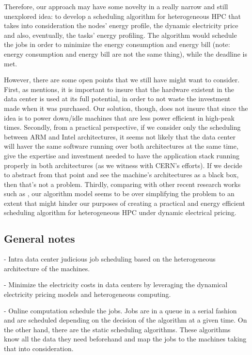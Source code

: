 Therefore, our approach may have some novelty in a really narrow and still
unexplored idea: to develop a scheduling algorithm for heterogeneous HPC that
takes into consideration the nodes' energy profile, the dynamic electricity
price and also, eventually, the tasks' energy profiling. The algorithm would
schedule the jobs in order to minimize the energy consumption and energy bill
(note: energy consumption and energy bill are not the same thing), while the
deadline is met. 

However, there are some open points that we still have might want to
consider. First, as \cite{DYN_PRICING_HPC} mentions, it is important to insure
that the hardware existent in the data center is used at its full potential, in
order to not waste the investment made when it was purchased. Our solution,
though, does not insure that since the idea is to power down/idle machines that 
are less power efficient in high-peak times. Secondly, from a practical
perspective, if we consider only the scheduling between ARM and Intel architectures, 
it seems not likely that the data center will haver the same software running
over both architectures at the same time, give the expertise and investment
needed to have the application stack running properly in both architectures (as
we witness with CERN's efforts). If we decide to abstract from that point and
see the machine's architectures as a black box, then that's not a problem. Thirdly, 
comparing with other recent research works
such as \cite{TASK_SCHED}, our algorithm model seems to be over simplifying the
problem to an extent that might hinder our purposes of creating a practical and
energy efficient scheduling algorithm for heterogeneous HPC under dynamic
electrical pricing.



\subsection*{General notes}

- Intra data center judicious job scheduling based on the heterogeneous
  architecture of the machines.

- Minimize the electricity costs in data centers by leveraging the dynamical 
  electricity pricing models and heterogeneous computing.

 - Online computation schedule the jobs. Jobs are in a queue in a serial fashion
  and are scheduled depending on the decision of the algorithm at a given time.
  On the other hand, there are the static scheduling algorithms. These
  algorithms know all the data they need beforehand and map the jobs to the
  machines taking that into consideration.

